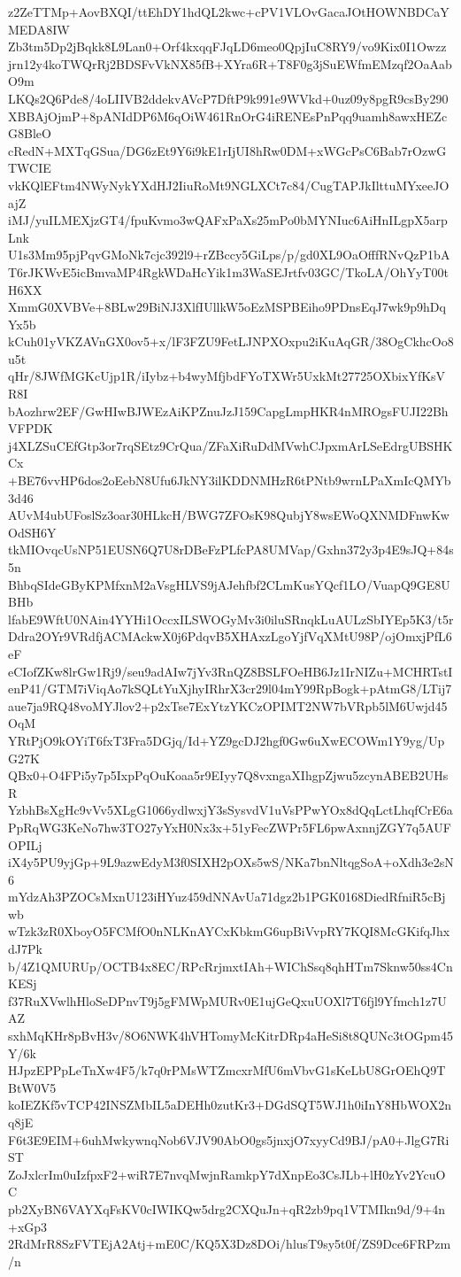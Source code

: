 z2ZeTTMp+AovBXQI/ttEhDY1hdQL2kwc+cPV1VLOvGacaJOtHOWNBDCaYMEDA8IW
Zb3tm5Dp2jBqkk8L9Lan0+Orf4kxqqFJqLD6meo0QpjIuC8RY9/vo9Kix0I1Owzz
jrn12y4koTWQrRj2BDSFvVkNX85fB+XYra6R+T8F0g3jSuEWfmEMzqf2OaAabO9m
LKQs2Q6Pde8/4oLIIVB2ddekvAVcP7DftP9k991e9WVkd+0uz09y8pgR9csBy290
XBBAjOjmP+8pANIdDP6M6qOiW461RnOrG4iRENEsPnPqq9uamh8awxHEZcG8BleO
cRedN+MXTqGSua/DG6zEt9Y6i9kE1rIjUI8hRw0DM+xWGcPsC6Bab7rOzwGTWCIE
vkKQlEFtm4NWyNykYXdHJ2IiuRoMt9NGLXCt7c84/CugTAPJkIlttuMYxeeJOajZ
iMJ/yuILMEXjzGT4/fpuKvmo3wQAFxPaXs25mPo0bMYNIuc6AiHnILgpX5arpLnk
U1s3Mm95pjPqvGMoNk7cjc392l9+rZBccy5GiLps/p/gd0XL9OaOfffRNvQzP1bA
T6rJKWvE5icBmvaMP4RgkWDaHcYik1m3WaSEJrtfv03GC/TkoLA/OhYyT00tH6XX
XmmG0XVBVe+8BLw29BiNJ3XlfIUllkW5oEzMSPBEiho9PDnsEqJ7wk9p9hDqYx5b
kCuh01yVKZAVnGX0ov5+x/lF3FZU9FetLJNPXOxpu2iKuAqGR/38OgCkhcOo8u5t
qHr/8JWfMGKcUjp1R/iIybz+b4wyMfjbdFYoTXWr5UxkMt27725OXbixYfKsVR8I
bAozhrw2EF/GwHIwBJWEzAiKPZnuJzJ159CapgLmpHKR4nMROgsFUJI22BhVFPDK
j4XLZSuCEfGtp3or7rqSEtz9CrQua/ZFaXiRuDdMVwhCJpxmArLSeEdrgUBSHKCx
+BE76vvHP6dos2oEebN8Ufu6JkNY3ilKDDNMHzR6tPNtb9wrnLPaXmIcQMYb3d46
AUvM4ubUFoslSz3oar30HLkcH/BWG7ZFOsK98QubjY8wsEWoQXNMDFnwKwOdSH6Y
tkMIOvqcUsNP51EUSN6Q7U8rDBeFzPLfcPA8UMVap/Gxhn372y3p4E9sJQ+84s5n
BhbqSIdeGByKPMfxnM2aVsgHLVS9jAJehfbf2CLmKusYQcf1LO/VuapQ9GE8UBHb
lfabE9WftU0NAin4YYHi1OccxILSWOGyMv3i0iluSRnqkLuAULzSbIYEp5K3/t5r
Ddra2OYr9VRdfjACMAckwX0j6PdqvB5XHAxzLgoYjfVqXMtU98P/ojOmxjPfL6eF
eCIofZKw8lrGw1Rj9/seu9adAIw7jYv3RnQZ8BSLFOeHB6Jz1IrNIZu+MCHRTstI
enP41/GTM7iViqAo7kSQLtYuXjhyIRhrX3cr29l04mY99RpBogk+pAtmG8/LTij7
aue7ja9RQ48voMYJlov2+p2xTse7ExYtzYKCzOPIMT2NW7bVRpb5lM6Uwjd45OqM
YRtPjO9kOYiT6fxT3Fra5DGjq/Id+YZ9gcDJ2hgf0Gw6uXwECOWm1Y9yg/UpG27K
QBx0+O4FPi5y7p5IxpPqOuKoaa5r9EIyy7Q8vxngaXIhgpZjwu5zcynABEB2UHsR
YzbhBsXgHc9vVv5XLgG1066ydlwxjY3sSysvdV1uVsPPwYOx8dQqLctLhqfCrE6a
PpRqWG3KeNo7hw3TO27yYxH0Nx3x+51yFecZWPr5FL6pwAxnnjZGY7q5AUFOPILj
iX4y5PU9yjGp+9L9azwEdyM3f0SIXH2pOXs5wS/NKa7bnNltqgSoA+oXdh3e2sN6
mYdzAh3PZOCsMxnU123iHYuz459dNNAvUa71dgz2b1PGK0168DiedRfniR5cBjwb
wTzk3zR0XboyO5FCMfO0nNLKnAYCxKbkmG6upBiVvpRY7KQI8McGKifqJhxdJ7Pk
b/4Z1QMURUp/OCTB4x8EC/RPcRrjmxtIAh+WIChSsq8qhHTm7Sknw50ss4CnKESj
f37RuXVwlhHloSeDPnvT9j5gFMWpMURv0E1ujGeQxuUOXl7T6fjl9Yfmch1z7UAZ
sxhMqKHr8pBvH3v/8O6NWK4hVHTomyMcKitrDRp4aHeSi8t8QUNc3tOGpm45Y/6k
HJpzEPPpLeTnXw4F5/k7q0rPMsWTZmcxrMfU6mVbvG1sKeLbU8GrOEhQ9TBtW0V5
koIEZKf5vTCP42INSZMbIL5aDEHh0zutKr3+DGdSQT5WJ1h0iInY8HbWOX2nq8jE
F6t3E9EIM+6uhMwkywnqNob6VJV90AbO0gs5jnxjO7xyyCd9BJ/pA0+JlgG7RiST
ZoJxlcrIm0uIzfpxF2+wiR7E7nvqMwjnRamkpY7dXnpEo3CsJLb+lH0zYv2YcuOC
pb2XyBN6VAYXqFsKV0cIWIKQw5drg2CXQuJn+qR2zb9pq1VTMIkn9d/9+4n+xGp3
2RdMrR8SzFVTEjA2Atj+mE0C/KQ5X3Dz8DOi/hlusT9sy5t0f/ZS9Dce6FRPzm/n
